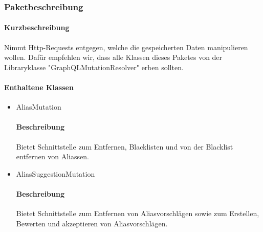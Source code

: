 \subsubsection*{Paketbeschreibung}%
\paragraph*{Kurzbeschreibung}
Nimmt Http-Requests entgegen, welche die gespeicherten Daten manipulieren wollen.
Dafür empfehlen wir, dass alle Klassen dieses Paketes von der Libraryklasse "GraphQLMutationResolver" erben sollten.
\paragraph*{Enthaltene Klassen}
\begin{itemize}
    \item AliasMutation
    		\paragraph*{Beschreibung}
            Bietet Schnittstelle zum Entfernen, Blacklisten und von der Blacklist entfernen von Aliassen.
    \item AliasSuggestionMutation
    		\paragraph*{Beschreibung}
    		Bietet Schnittstelle zum Entfernen von Aliasvorschlägen sowie zum Erstellen, Bewerten und akzeptieren von Aliasvorschlägen.
\end{itemize}